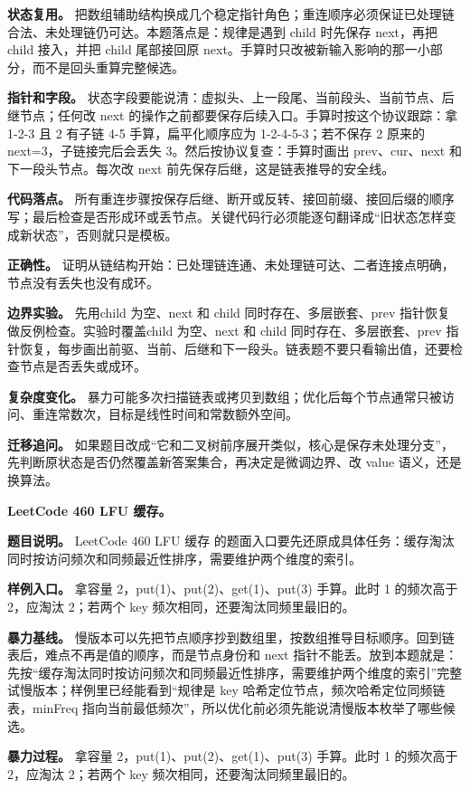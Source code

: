 \textbf{状态复用。} 把数组辅助结构换成几个稳定指针角色；重连顺序必须保证已处理链合法、未处理链仍可达。本题落点是：规律是遇到 child 时先保存 next，再把 child 接入，并把 child 尾部接回原 next。手算时只改被新输入影响的那一小部分，而不是回头重算完整候选。

\textbf{指针和字段。} 状态字段要能说清：虚拟头、上一段尾、当前段头、当前节点、后继节点；任何改 next 的操作之前都要保存后续入口。手算时按这个协议跟踪：拿 1-2-3 且 2 有子链 4-5 手算，扁平化顺序应为 1-2-4-5-3；若不保存 2 原来的 next=3，子链接完后会丢失 3。然后按协议复查：手算时画出 prev、cur、next 和下一段头节点。每次改 next 前先保存后继，这是链表推导的安全线。

\textbf{代码落点。} 所有重连步骤按保存后继、断开或反转、接回前缀、接回后缀的顺序写；最后检查是否形成环或丢节点。关键代码行必须能逐句翻译成“旧状态怎样变成新状态”，否则就只是模板。

\textbf{正确性。} 证明从链结构开始：已处理链连通、未处理链可达、二者连接点明确，节点没有丢失也没有成环。

\textbf{边界实验。} 先用child 为空、next 和 child 同时存在、多层嵌套、prev 指针恢复做反例检查。实验时覆盖child 为空、next 和 child 同时存在、多层嵌套、prev 指针恢复，每步画出前驱、当前、后继和下一段头。链表题不要只看输出值，还要检查节点是否丢失或成环。

\textbf{复杂度变化。} 暴力可能多次扫描链表或拷贝到数组；优化后每个节点通常只被访问、重连常数次，目标是线性时间和常数额外空间。

\textbf{迁移追问。} 如果题目改成“它和二叉树前序展开类似，核心是保存未处理分支”，先判断原状态是否仍然覆盖新答案集合，再决定是微调边界、改 value 语义，还是换算法。

\noindent\textbf{LeetCode 460 LFU 缓存。}

\textbf{题目说明。} LeetCode 460 LFU 缓存 的题面入口要先还原成具体任务：缓存淘汰同时按访问频次和同频最近性排序，需要维护两个维度的索引。

\textbf{样例入口。} 拿容量 2，put(1)、put(2)、get(1)、put(3) 手算。此时 1 的频次高于 2，应淘汰 2；若两个 key 频次相同，还要淘汰同频里最旧的。

\textbf{暴力基线。} 慢版本可以先把节点顺序抄到数组里，按数组推导目标顺序。回到链表后，难点不再是值的顺序，而是节点身份和 next 指针不能丢。放到本题就是：先按“缓存淘汰同时按访问频次和同频最近性排序，需要维护两个维度的索引”完整试慢版本；样例里已经能看到“规律是 key 哈希定位节点，频次哈希定位同频链表，minFreq 指向当前最低频次”，所以优化前必须先能说清慢版本枚举了哪些候选。

\textbf{暴力过程。} 拿容量 2，put(1)、put(2)、get(1)、put(3) 手算。此时 1 的频次高于 2，应淘汰 2；若两个 key 频次相同，还要淘汰同频里最旧的。

